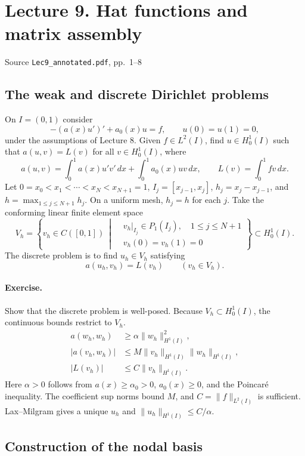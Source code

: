 \documentclass[11pt,a4paper]{article}
\newcommand{\lecturesource}[1]{%
  \par{\small\sffamily\color{Muted}#1}\par\vspace{0.15em}}
\begin{document}
\clearpage
\section{Lecture 9. Hat functions and matrix assembly}
\lecturesource{Source \enspace\texttt{Lec9\_annotated.pdf}, pp.~1--8}

\subsection{The weak and discrete Dirichlet problems}

On \(I=(0,1)\) consider
\[
 -(a(x)u')'+a_0(x)u=f,\qquad u(0)=u(1)=0,
\]
under the assumptions of Lecture 8. Given \(f\in L^2(I)\), find
\(u\in H_0^1(I)\) such that \(a(u,v)=L(v)\) for all \(v\in H_0^1(I)\), where
\[
 a(u,v)=\int_0^1 a(x)u'v'\,dx+\int_0^1 a_0(x)uv\,dx,\qquad
 L(v)=\int_0^1fv\,dx .
\]
Let \(0=x_0<x_1<\cdots<x_N<x_{N+1}=1\),
\(I_j=[x_{j-1},x_j]\), \(h_j=x_j-x_{j-1}\), and
\(h=\max_{1\le j\le N+1}h_j\). On a uniform mesh, \(h_j=h\) for each \(j\).
Take the conforming linear finite element space
\[
 V_h=\left\{v_h\in C([0,1])\
 \middle|\begin{aligned}
  &v_h|_{I_j}\in P_1(I_j),\quad 1\le j\le N+1\\
  &v_h(0)=v_h(1)=0
 \end{aligned}\right\}\subset H_0^1(I).
\]
The discrete problem is to find \(u_h\in V_h\) satisfying
\[
 a(u_h,v_h)=L(v_h)\qquad(v_h\in V_h).
\]

\paragraph{Exercise.}
Show that the discrete problem is well-posed. Because \(V_h\subset H_0^1(I)\),
the continuous bounds restrict to \(V_h\).
\[
 \begin{aligned}
 a(w_h,w_h)&\ge \alpha\|w_h\|_{H^1(I)}^2,\\
 |a(v_h,w_h)|&\le M\|v_h\|_{H^1(I)}\|w_h\|_{H^1(I)},\\
 |L(v_h)|&\le C\|v_h\|_{H^1(I)} .
 \end{aligned}
\]
Here \(\alpha>0\) follows from \(a(x)\ge\alpha_0>0\), \(a_0(x)\ge0\), and
the Poincar\'e inequality. The coefficient sup norms bound \(M\), and
\(C=\|f\|_{L^2(I)}\) is sufficient. Lax--Milgram gives a unique \(u_h\) and
\(\|u_h\|_{H^1(I)}\le C/\alpha\).

\subsection{Construction of the nodal basis}
\end{document}
